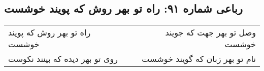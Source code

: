 \begin{center}
\section*{رباعی شماره ۹۱: راه تو بهر روش که پویند خوشست}
\label{sec:sh091}
\begin{longtable}{l p{0.5cm} r}
راه تو بهر روش که پویند خوشست
&&
وصل تو بهر جهت که جویند خوشست
\\
روی تو بهر دیده که بینند نکوست
&&
نام تو بهر زبان که گویند خوشست
\\
\end{longtable}
\end{center}
